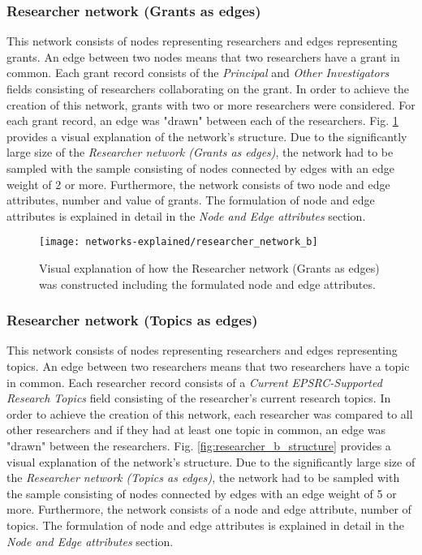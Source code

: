 \subsubsection{Researcher network (Grants as edges)}

This network consists of nodes representing researchers and edges representing grants. An edge between two nodes means that two researchers have a grant in common. Each grant record consists of the \textit{Principal} and \textit{Other Investigators} fields consisting of researchers collaborating on the grant. In order to achieve the creation of this network, grants with two or more researchers were considered. For each grant record, an edge was "drawn" between each of the researchers. Fig. \ref{fig:researcher_a_structure} provides a visual explanation of the network's structure. Due to the significantly large size of the \textit{Researcher network (Grants as edges)}, the network had to be sampled with the sample consisting of nodes connected by edges with an edge weight of 2 or more. Furthermore, the network consists of two node and edge attributes, number and value of grants. The formulation of node and edge attributes is explained in detail in the \textit{Node and Edge attributes} section.

\begin{figure}[htpb]
    \centering
    \texttt{[image: networks-explained/researcher\_network\_b]}
    \caption{Visual explanation of how the Researcher network (Grants as edges) was constructed including the formulated node and edge attributes.}
    \label{fig:researcher_a_structure}
\end{figure}

\subsubsection{Researcher network (Topics as edges)}

This network consists of nodes representing researchers and edges representing topics. An edge between two researchers means that two researchers have a topic in common. Each researcher record consists of a \textit{Current EPSRC-Supported Research Topics} field consisting of the researcher's current research topics. In order to achieve the creation of this network, each researcher was compared to all other researchers and if they had at least one topic in common, an edge was "drawn" between the researchers. Fig. \ref{fig:researcher_b_structure} provides a visual explanation of the network's structure. Due to the significantly large size of the \textit{Researcher network (Topics as edges)}, the network had to be sampled with the sample consisting of nodes connected by edges with an edge weight of 5 or more. Furthermore, the network consists of a node and edge attribute, number of topics. The formulation of node and edge attributes is explained in detail in the \textit{Node and Edge attributes} section.

